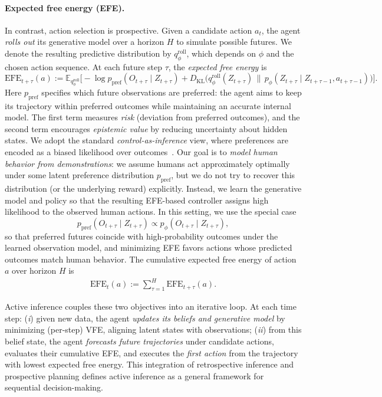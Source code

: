 \documentclass{article} %
\newcommand{\revise}[1]{#1}
\begin{document}
\paragraph{Expected free energy (EFE).}
In contrast, action selection is prospective.  
Given a candidate action $a_t$, the agent \emph{rolls out} its generative model over a horizon $H$ to simulate possible futures. 
We denote the resulting predictive distribution by $q_\phi^{\text{roll}}$, which depends on $\phi$ and the chosen action sequence.  
At each future step $\tau$, the \emph{expected free energy} is
\revise{{\small
$$
\text{EFE}_{t+\tau}(a) :=
\mathbb{E}_{q_\phi^{\text{roll}}} \Big[
  -\log p_{\text{pref}}(O_{t+\tau}\mid Z_{t+\tau})
  + D_{\mathrm{KL}}\!\big(q_\phi^{\text{roll}}(Z_{t+\tau}) \,\|\, p_\phi(Z_{t+\tau}\mid Z_{t+\tau-1},a_{t+\tau-1})\big)
\Big].
$$}
Here $p_{\text{pref}}$ specifies which future observations are preferred: the agent aims to keep its trajectory within preferred outcomes while maintaining an accurate internal model.} The first term measures \emph{risk} (deviation from preferred outcomes), and the second term encourages \emph{epistemic value} by reducing uncertainty about hidden states. \revise{We adopt the standard \emph{control-as-inference} view, where preferences are encoded as a biased likelihood over outcomes~\citep{levine2018reinforcement, toussaint2009robot}. Our goal is to \emph{model human behavior from demonstrations}: we assume humans act approximately optimally under some latent preference distribution $p_{\text{pref}}$, but we do not try to recover this distribution (or the underlying reward) explicitly. Instead, we learn the generative model and policy so that the resulting EFE-based controller assigns high likelihood to the observed human actions. In this setting, we use the special case
{\small
$$
p_{\text{pref}}(O_{t+\tau}\mid Z_{t+\tau}) \propto p_\phi(O_{t+\tau}\mid Z_{t+\tau}),
$$}
so that preferred futures coincide with high-probability outcomes under the learned observation model, and minimizing EFE favors actions whose predicted outcomes match human behavior.
} The cumulative expected free energy of action $a$ over horizon $H$ is
{\small
\begin{align}
\text{EFE}_{t}(a) := \sum_{\tau=1}^H \text{EFE}_{t+\tau}(a).
\label{eq:EFE}
\end{align}}

Active inference couples these two objectives into an iterative loop.  
At each time step:  
({\it i}) given new data, the agent \emph{updates its beliefs and generative model} by minimizing (per-step) VFE, aligning latent states with observations;  
({\it ii}) from this belief state, the agent \emph{forecasts future trajectories} under candidate actions, evaluates their cumulative EFE, and executes the {\it first action} from the trajectory with lowest expected free energy.  
This integration of retrospective inference and prospective planning defines active inference as a general framework for sequential decision-making.  
\end{document}
